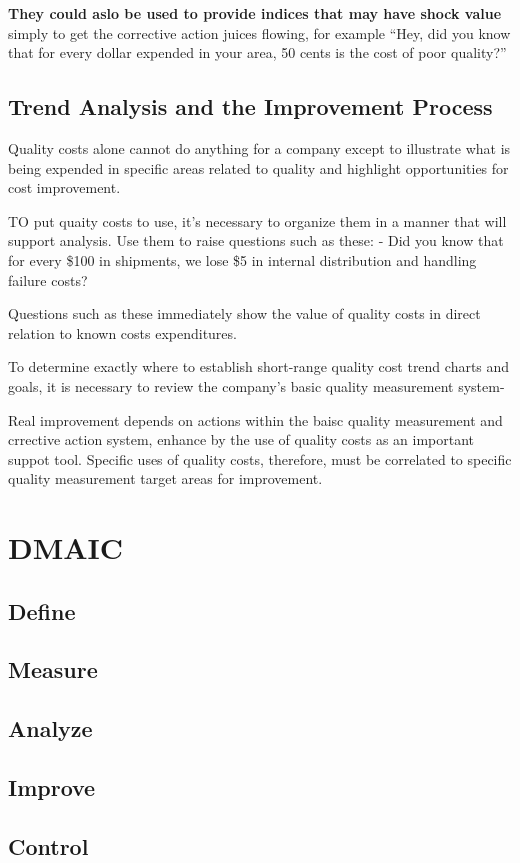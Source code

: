\documentclass[11pt]{article}
\begin{document}
\textbf{They could aslo be used to provide indices that may have shock
value} simply to get the corrective action juices flowing, for example
``Hey, did you know that for every dollar expended in your area, 50
cents is the cost of poor quality?''

\hypertarget{trend-analysis-and-the-improvement-process}{%
\subsection{Trend Analysis and the Improvement
Process}\label{trend-analysis-and-the-improvement-process}}

Quality costs alone cannot do anything for a company except to
illustrate what is being expended in specific areas related to quality
and highlight opportunities for cost improvement.

TO put quaity costs to use, it's necessary to organize them in a manner
that will support analysis. Use them to raise questions such as these: -
Did you know that for every \$100 in shipments, we lose \$5 in internal
distribution and handling failure costs?

Questions such as these immediately show the value of quality costs in
direct relation to known costs expenditures.

To determine exactly where to establish short-range quality cost trend
charts and goals, it is necessary to review the company's basic quality
measurement system-

Real improvement depends on actions within the baisc quality measurement
and crrective action system, enhance by the use of quality costs as an
important suppot tool. Specific uses of quality costs, therefore, must
be correlated to specific quality measurement target areas for
improvement.

    \hypertarget{dmaic}{%
\section{DMAIC}\label{dmaic}}

\hypertarget{define}{%
\subsection{Define}\label{define}}

\hypertarget{measure}{%
\subsection{Measure}\label{measure}}

\hypertarget{analyze}{%
\subsection{Analyze}\label{analyze}}

\hypertarget{improve}{%
\subsection{Improve}\label{improve}}

\hypertarget{control}{%
\subsection{Control}\label{control}}


    
    
    
\end{document}
